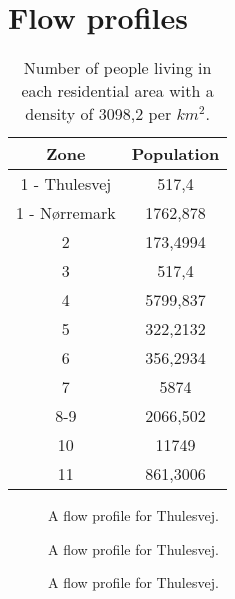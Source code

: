 \newpage
\section{Flow profiles}\label{app:flow_profiles}



\begin{table}[H]
\centering
\begin{tabular}{|c|c|}
\hline
\textbf{Zone} & \textbf{Population} \\ \hline
1 - Thulesvej & 517,4                \\ \hline
1 - Nørremark & 1762,878             \\ \hline
2             & 173,4994             \\ \hline
3             & 517,4                \\ \hline
4             & 5799,837             \\ \hline
5             & 322,2132             \\ \hline
6             & 356,2934             \\ \hline
7             & 5874                 \\ \hline
8-9           & 2066,502             \\ \hline
10            & 11749                \\ \hline
11            & 861,3006             \\ \hline
\end{tabular}
\caption{Number of people living in each residential area with a density of 3098,2 per $km^2$.}
\label{tab:population_in_the_residential_area}
\end{table}

\begin{figure}[H]
\centering

\caption{A flow profile for Thulesvej.}
\label{fig:APP_flow_profile_thulevej}
\end{figure} 

\begin{figure}[H]
\centering

\caption{A flow profile for Thulesvej.}
\label{fig:APP_flow_profile_norregade}
\end{figure} 

\begin{figure}[H]
\centering

\caption{A flow profile for Thulesvej.}
\label{fig:APP_flow_profile_zone2}
\end{figure} 

